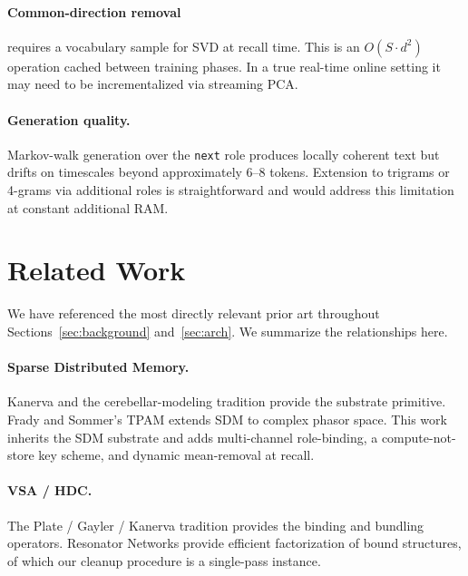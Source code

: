 \documentclass[11pt,a4paper]{article}
\begin{document}
\paragraph{Common-direction removal} requires a vocabulary sample for
SVD at recall time.  This is an $O(S \cdot d^2)$ operation cached
between training phases.  In a true real-time online setting it may
need to be incrementalized via streaming PCA.

\paragraph{Generation quality.}  Markov-walk generation over the
\texttt{next} role produces locally coherent text but drifts on
timescales beyond approximately 6--8 tokens.  Extension to trigrams or
4-grams via additional roles is straightforward and would address this
limitation at constant additional RAM.

\section{Related Work}
\label{sec:related}

We have referenced the most directly relevant prior art throughout
Sections~\ref{sec:background} and~\ref{sec:arch}.  We summarize the
relationships here.

\paragraph{Sparse Distributed Memory.}  Kanerva \cite{kanerva1988sparse}
and the cerebellar-modeling tradition
\cite{marr1969cerebellum,albus1971theory,eccles1967cerebellum,ito2008control}
provide the substrate primitive.  Frady and Sommer's TPAM
\cite{frady2019robust} extends SDM to complex phasor space.  This work
inherits the SDM substrate and adds multi-channel role-binding, a
compute-not-store key scheme, and dynamic mean-removal at recall.

\paragraph{VSA / HDC.}  The Plate / Gayler / Kanerva tradition
\cite{plate1995holographic,gayler2003vector,kanerva2009hyperdimensional}
provides the binding and bundling operators.  Resonator Networks
\cite{frady2020resonator,kent2020resonator2} provide efficient
factorization of bound structures, of which our cleanup procedure is a
single-pass instance.
\end{document}
